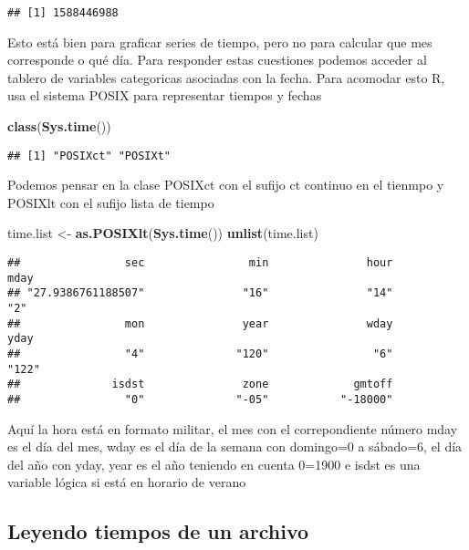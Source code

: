\documentclass[]{article}
\newenvironment{Shaded}{\begin{snugshade}}{\end{snugshade}}
\newcommand{\KeywordTok}[1]{\textcolor[rgb]{0.13,0.29,0.53}{\textbf{#1}}}
\newcommand{\StringTok}[1]{\textcolor[rgb]{0.31,0.60,0.02}{#1}}
\newcommand{\NormalTok}[1]{#1}
\begin{document}
\begin{verbatim}
## [1] 1588446988
\end{verbatim}

Esto está bien para graficar series de tiempo, pero no para calcular que
mes corresponde o qué día. Para responder estas cuestiones podemos
acceder al tablero de variables categoricas asociadas con la fecha. Para
acomodar esto R, usa el sistema POSIX para representar tiempos y fechas

\begin{Shaded}
\begin{Highlighting}[]
\KeywordTok{class}\NormalTok{(}\KeywordTok{Sys.time}\NormalTok{())}
\end{Highlighting}
\end{Shaded}

\begin{verbatim}
## [1] "POSIXct" "POSIXt"
\end{verbatim}

Podemos pensar en la clase POSIXct con el sufijo ct continuo en el
tienmpo y POSIXlt con el sufijo lista de tiempo

\begin{Shaded}
\begin{Highlighting}[]
\NormalTok{time.list <-}\StringTok{ }\KeywordTok{as.POSIXlt}\NormalTok{(}\KeywordTok{Sys.time}\NormalTok{())}
\KeywordTok{unlist}\NormalTok{(time.list)}
\end{Highlighting}
\end{Shaded}

\begin{verbatim}
##                sec                min               hour               mday 
## "27.9386761188507"               "16"               "14"                "2" 
##                mon               year               wday               yday 
##                "4"              "120"                "6"              "122" 
##              isdst               zone             gmtoff 
##                "0"              "-05"           "-18000"
\end{verbatim}

Aquí la hora está en formato militar, el mes con el correpondiente
número mday es el día del mes, wday es el día de la semana con domingo=0
a sábado=6, el día del año con yday, year es el año teniendo en cuenta
0=1900 e isdst es una variable lógica si está en horario de verano

\subsection{Leyendo tiempos de un
archivo}\label{leyendo-tiempos-de-un-archivo}
\end{document}
